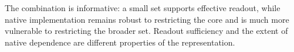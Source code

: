 The combination is informative: a small set supports effective readout, while native implementation remains robust to restricting the core and is much more vulnerable to restricting the broader set. Readout sufficiency and the extent of native dependence are different properties of the representation.
